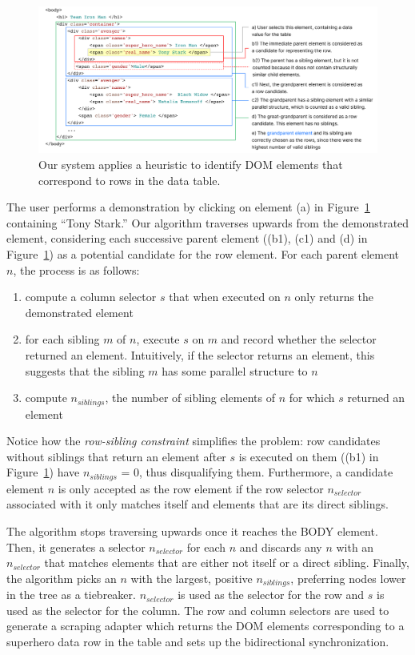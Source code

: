 \documentclass[sigconf,10pt]{acmart}
\providecommand{\tightlist}{%
  \setlength{\itemsep}{0pt}\setlength{\parskip}{0pt}}
\begin{document}
\begin{figure}
  \includegraphics[width=\textwidth]{media/algorithm.png}
  \caption{\label{fig:algorithm}Our system applies a heuristic to identify DOM elements that correspond to rows in the data table.}
\end{figure}

The user performs a demonstration by clicking on element (a) in
Figure~\ref{fig:algorithm} containing ``Tony Stark.'' Our algorithm
traverses upwards from the demonstrated element, considering each
successive parent element ((b1), (c1) and (d) in
Figure~\ref{fig:algorithm}) as a potential candidate for the row
element. For each parent element \(n\), the process is as follows:

\begin{enumerate}
\def\labelenumi{\arabic{enumi}.}
\tightlist
\item
  compute a column selector \(s\) that when executed on \(n\) only
  returns the demonstrated element
\item
  for each sibling \(m\) of \(n\), execute \(s\) on \(m\) and record
  whether the selector returned an element. Intuitively, if the selector
  returns an element, this suggests that the sibling \(m\) has some
  parallel structure to \(n\)
\item
  compute \(n_{siblings}\), the number of sibling elements of \(n\) for
  which \(s\) returned an element
\end{enumerate}

Notice how the \emph{row-sibling constraint} simplifies the problem: row
candidates without siblings that return an element after \(s\) is
executed on them ((b1) in Figure~\ref{fig:algorithm}) have
\(n_{siblings}\) = 0, thus disqualifying them. Furthermore, a candidate
element \(n\) is only accepted as the row element if the row selector
\(n_{selector}\) associated with it only matches itself and elements
that are its direct siblings.

The algorithm stops traversing upwards once it reaches the BODY element.
Then, it generates a selector \(n_{selector}\) for each \(n\) and
discards any \(n\) with an \(n_{selector}\) that matches elements that
are either not itself or a direct sibling. Finally, the algorithm picks
an \(n\) with the largest, positive \(n_{siblings}\), preferring nodes
lower in the tree as a tiebreaker. \(n_{selector}\) is used as the
selector for the row and \(s\) is used as the selector for the column.
The row and column selectors are used to generate a scraping adapter
which returns the DOM elements corresponding to a superhero data row in
the table and sets up the bidirectional synchronization.
\end{document}
